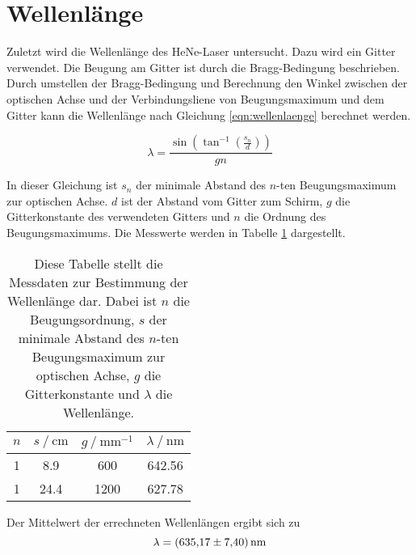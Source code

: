\section{Wellenlänge}
\label{sec:Wellenlänge}
Zuletzt wird die Wellenlänge des HeNe-Laser untersucht. Dazu wird ein Gitter verwendet. Die Beugung am Gitter ist durch die Bragg-Bedingung beschrieben. Durch umstellen der 
Bragg-Bedingung und Berechnung den Winkel zwischen der optischen Achse und der Verbindungsliene von Beugungsmaximum und dem Gitter kann die Wellenlänge nach Gleichung \ref{eqn:wellenlaenge}
berechnet werden.

\begin{equation}
    \label{eqn:wellenlaenge}
    \lambda = \frac{\sin\left(\tan^{-1}\left(\frac{s_n}{d}\right)\right)}{gn}
\end{equation}

In dieser Gleichung ist $s_n$ der minimale Abstand des $n$-ten Beugungsmaximum zur optischen Achse. $d$ ist der Abstand vom Gitter zum Schirm, $g$ die Gitterkonstante des verwendeten 
Gitters und $n$ die Ordnung des Beugungsmaximums. Die Messwerte werden in Tabelle \ref{tab:wellenlaenge} dargestellt.  

\begin{table}
    \centering
    \begin{tabular}{c c c c}
        \toprule
        {$n$} & {$s \mathbin{/} \unit{\centi\metre}$} & {$g \mathbin{/} \unit{\milli\metre}^{-1}$} & {$\lambda \mathbin{/} \unit{\nano\metre}$}\\
        \midrule
         1  &  8.9 &  600 & 642.56 \\
         1  & 24.4 & 1200 & 627.78 \\

        \bottomrule
    \end{tabular}
    \caption{Diese Tabelle stellt die Messdaten zur Bestimmung der Wellenlänge dar. Dabei ist $n$ die Beugungsordnung, $s$ der minimale Abstand des $n$-ten Beugungsmaximum zur optischen Achse,
    $g$ die Gitterkonstante und $\lambda$ die Wellenlänge.}
    \label{tab:wellenlaenge}
\end{table}

Der Mittelwert der errechneten Wellenlängen ergibt sich zu 
\begin{equation*}
    \lambda = \qty{635.17 +- 7.40}{\nano\metre}
\end{equation*} 
